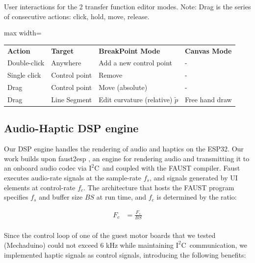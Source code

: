 \documentclass[sigconf]{nimeart}
\begin{document}
User interactions for the 2 transfer function editor modes. Note: Drag is the series of consecutive actions: click, hold, move, release.

\begin{table}[htbp]\centering\small
\begin{adjustbox}{max width=\textwidth}\begin{tabular}{llll}
\toprule
\midrule
\textbf{Action} & \textbf{Target} & \textbf{BreakPoint Mode} & \textbf{Canvas Mode} \\
Double-click & Anywhere & Add a new control point & - \\
Single click & Control point & Remove & - \\
Drag & Control point & Move (absolute) & - \\
Drag & Line Segment & Edit curvature (relative) $\tilde{p}$ & Free hand draw \\
\bottomrule
\end{tabular}\end{adjustbox}\end{table}

\subsection{Audio-Haptic DSP engine}\label{audio-haptic-dsp-engine}

Our DSP engine handles the rendering of audio and haptics on the ESP32. Our work builds upon faust2esp \cite{Michon2020faust}, an engine for rendering audio and transmitting it to an onboard audio codec via $\mathrm{I^2 C}$~and coupled with the FAUST compiler. Faust executes audio-rate signals at the sample-rate $f_s$, and signals generated by UI elements at control-rate $f_c$. The architecture that hosts the FAUST program specifies $f_s$ and buffer size $BS$ at run time, and $f_c$ is determined by the ratio:


\begin{equation}\begin{aligned}
        F_c &= \frac{F_s}{BS} \\\end{aligned}\end{equation}


Since the control loop of one of the guest motor boards that we tested (Mechaduino) could not exceed 6 kHz while maintaining $\mathrm{I^2 C}$~communication, we implemented haptic signals as control signals, introducing the following benefits:
\end{document}
